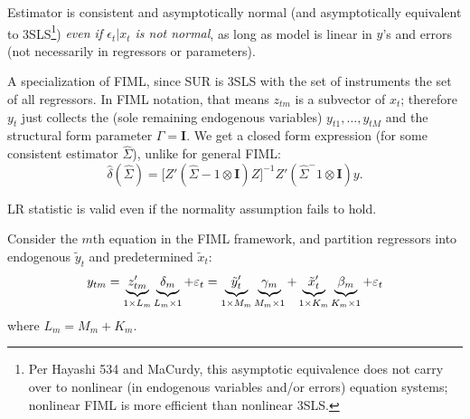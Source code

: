 \documentclass[8pt,letterpaper, landscape]{extarticle} %
\newcommand{\mI}{\ensuremath{\mathbf{I}}}
\begin{document}
\begin{multicols}{3}
\begin{description}
Estimator is consistent and asymptotically normal (and asymptotically equivalent to 3SLS\footnote{Per Hayashi 534 and MaCurdy, this asymptotic equivalence does not carry over to nonlinear (in endogenous variables and/or errors) equation systems; nonlinear FIML is more efficient than nonlinear 3SLS.}) \textit{even if $ \epsilon_t | x_t $ is not normal}, as long as model is linear in $ y $'s and errors (not necessarily in regressors or parameters).

 A specialization of FIML, since SUR is 3SLS with the set of instruments the set of all regressors. In FIML notation, that means $ z_{tm} $ is a subvector of $ x_t $; therefore $ y_t $ just collects the (sole remaining endogenous variables) $ y_{t1}, \dotsc, y_{tM} $ and the structural form parameter $ \Gamma = \mI $. We get a closed form expression (for some consistent estimator $ \widehat{\Sigma} $), unlike for general FIML:
\[ \hat{\delta} (\widehat{\Sigma}) = \bigl [ Z' (\widehat{\Sigma}-1 \otimes \mI) Z \bigr ]^{-1} Z' (\widehat{\Sigma}^-1 \otimes \mI) y . \]

LR statistic is valid even if the normality assumption fails to hold.

 Consider the $ m $th equation in the FIML framework, and partition regressors into endogenous $ \tilde{y}_t $ and predetermined $ \tilde{x}_t $:
\[ y_{tm} = \underbrace{z_{tm}' \vphantom{z_{tm}' \delta_{m} \tilde{y}_{t}' \gamma_m \tilde{x}_{t}' \beta_m} }_{1 \times L_m} \underbrace{\delta_{m} \vphantom{z_{tm}' \delta_{m} \tilde{y}_{t}' \gamma_m \tilde{x}_{t}' \beta_m} }_{L_m \times 1} + \epsilon_t
= \underbrace{\tilde{y}_{t}' \vphantom{z_{tm}' \delta_{m} \tilde{y}_{t}' \gamma_m \tilde{x}_{t}' \beta_m} }_{1 \times M_m} \underbrace{\gamma_m \vphantom{z_{tm}' \delta_{m} \tilde{y}_{t}' \gamma_m \tilde{x}_{t}' \beta_m} }_{M_m \times 1} + \underbrace{\tilde{x}_{t}' \vphantom{z_{tm}' \delta_{m} \tilde{y}_{t}' \gamma_m \tilde{x}_{t}' \beta_m} }_{1 \times K_m} \underbrace{\beta_m \vphantom{z_{tm}' \delta_{m} \tilde{y}_{t}' \gamma_m \tilde{x}_{t}' \beta_m} }_{K_m \times 1} + \epsilon_t \]
where $ L_m = M_m + K_m $.


\end{description}
\end{multicols}
\end{document}
